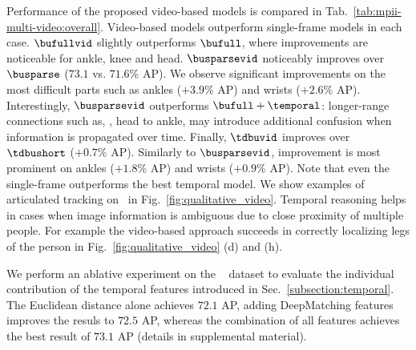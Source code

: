  Performance of the
proposed video-based models is compared in
Tab.~\ref{tab:mpii-multi-video:overall}. Video-based models outperform
single-frame models in each case. $\bufullvid$ slightly outperforms
$\bufull$, where improvements are noticeable for ankle, knee and
head. $\busparsevid$ noticeably improves over $\busparse$ ($73.1$
vs. $71.6$\% AP). We observe significant improvements on the most
difficult parts such as ankles ($+3.9$\% AP) and wrists ($+2.6$\%
AP). Interestingly, $\busparsevid$ outperforms $\bufull+\temporal$:
longer-range connections such as, \eg, head to ankle, may introduce
additional confusion when information is propagated over
time. Finally, $\tdbuvid$ improves over $\tdbushort$ ($+0.7$\%
AP). Similarly to $\busparsevid$, improvement is most prominent on
ankles ($+1.8$\% AP) and wrists ($+0.9$\% AP). Note that even the
single-frame \tdbushort{} outperforms the best temporal \bushort{}
model. 
We show examples of articulated tracking on \videodata~in Fig.~\ref{fig:qualitative_video}. Temporal reasoning helps in cases
when image information is ambiguous due to close proximity of multiple
people. For example the video-based approach succeeds in correctly
localizing legs of the person in Fig.~\ref{fig:qualitative_video} (d)
and (h). 


 We perform an ablative experiment on the \videodata~ dataset to
evaluate the individual contribution of the temporal features introduced in
Sec.~\ref{subsection:temporal}. The Euclidean distance alone achieves $72.1$ AP, adding DeepMatching
features improves the resuls to $72.5$ AP, whereas the combination of all features achieves the best result
of $73.1$ AP (details in supplemental material).



